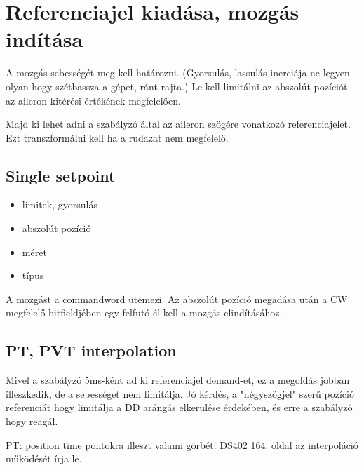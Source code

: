 \section{Referenciajel kiadása, mozgás indítása}


A mozgás sebességét meg kell határozni. (Gyorsulás, lassulás inerciája ne legyen olyan hogy szétbassza a gépet, ránt rajta.) Le kell limitálni az abszolút pozíciót az aileron kitérési értékének megfelelően.

Majd ki lehet adni a szabályzó által az aileron szögére vonatkozó referenciajelet. Ezt transzformálni kell ha a rudazat nem megfelelő.



\subsection{Single setpoint}

	\begin{itemize}
		\item limitek, gyorsulás
		\item abszolút pozíció
		\item méret
		\item típus
	\end{itemize}

A mozgást a commandword ütemezi. Az abszolút pozíció megadása után a CW megfelelő bitfieldjében egy felfutó él kell a mozgás elindításához.

\subsection{PT, PVT interpolation}

Mivel a szabályzó 5ms-ként ad ki referenciajel demand-et, ez a megoldás jobban illeszkedik, de a sebességet nem limitálja.
Jó kérdés, a "négyszögjel" szerű pozíció referenciát hogy limitálja a DD  arángás elkerülése érdekében, és erre a szabályzó hogy reagál.

PT: position time pontokra illeszt valami görbét.
DS402 164. oldal az interpoláció működését írja le.